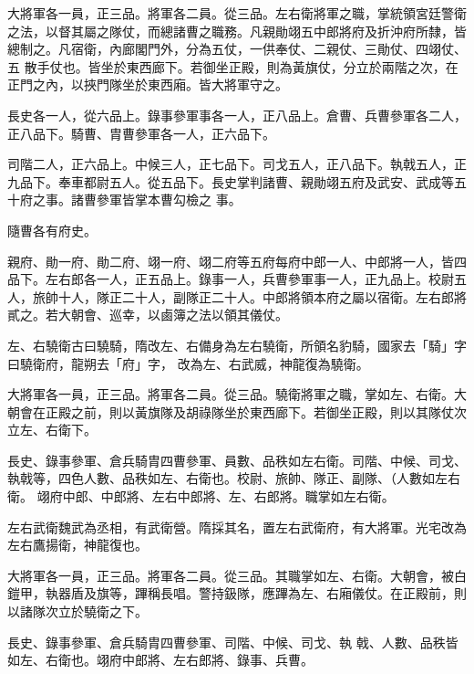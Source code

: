 \begin{pinyinscope}
 大將軍各一員，正三品。將軍各二員。從三品。左右衛將軍之職，掌統領宮廷警衛之法，以督其屬之隊仗，而總諸曹之職務。凡親勛翊五中郎將府及折沖府所隸，皆總制之。凡宿衛，內廊閣門外，分為五仗，一供奉仗、二親仗、三勛仗、四翊仗、五
 散手仗也。皆坐於東西廊下。若御坐正殿，則為黃旗仗，分立於兩階之次，在正門之內，以挾門隊坐於東西廂。皆大將軍守之。



 長史各一人，從六品上。錄事參軍事各一人，正八品上。倉曹、兵曹參軍各二人，正八品下。騎曹、胄曹參軍各一人，正六品下。



 司階二人，正六品上。中候三人，正七品下。司戈五人，正八品下。執戟五人，正九品下。奉車都尉五人。從五品下。長史掌判諸曹、親勛翊五府及武安、武成等五十府之事。諸曹參軍皆掌本曹勾檢之
 事。



 隨曹各有府史。



 親府、勛一府、勛二府、翊一府、翊二府等五府每府中郎一人、中郎將一人，皆四品下。左右郎各一人，正五品上。錄事一人，兵曹參軍事一人，正九品上。校尉五人，旅帥十人，隊正二十人，副隊正二十人。中郎將領本府之屬以宿衛。左右郎將貳之。若大朝會、巡幸，以鹵簿之法以領其儀仗。



 左、右驍衛古曰驍騎，隋改左、右備身為左右驍衛，所領名豹騎，國家去「騎」字曰驍衛府，龍朔去「府」字，
 改為左、右武威，神龍復為驍衛。



 大將軍各一員，正三品。將軍各二員。從三品。驍衛將軍之職，掌如左、右衛。大朝會在正殿之前，則以黃旗隊及胡祿隊坐於東西廊下。若御坐正殿，則以其隊仗次立左、右衛下。



 長史、錄事參軍、倉兵騎胄四曹參軍、員數、品秩如左右衛。司階、中候、司戈、執戟等，四色人數、品秩如左、右衛也。校尉、旅帥、隊正、副隊、（人數如左右衛。
 翊府中郎、中郎將、左右中郎將、左、右郎將。職掌如左右衛。



 左右武衛魏武為丞相，有武衛營。隋採其名，置左右武衛府，有大將軍。光宅改為左右鷹揚衛，神龍復也。



 大將軍各一員，正三品。將軍各二員。從三品。其職掌如左、右衛。大朝會，被白鎧甲，執器盾及旗等，蹕稱長唱。警持鈒隊，應蹕為左、右廂儀仗。在正殿前，則以諸隊次立於驍衛之下。



 長史、錄事參軍、倉兵騎胄四曹參軍、司階、中候、司戈、執
 戟、人數、品秩皆如左、右衛也。翊府中郎將、左右郎將、錄事、兵曹。




\end{pinyinscope}
